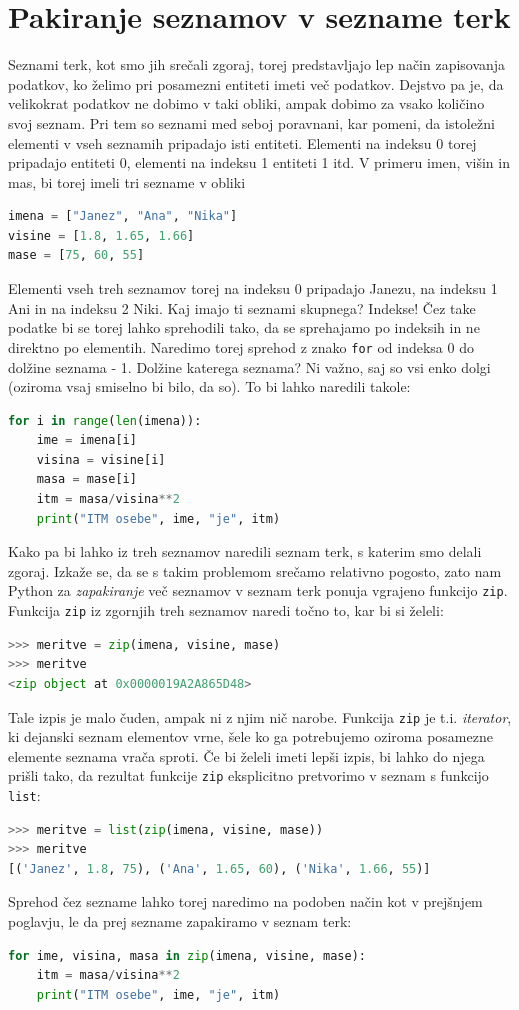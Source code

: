 \section{Pakiranje seznamov v sezname terk}
Seznami terk, kot smo jih srečali zgoraj, torej predstavljajo lep način zapisovanja podatkov, ko želimo pri posamezni entiteti imeti več podatkov. Dejstvo pa je, da velikokrat podatkov ne dobimo v taki obliki, ampak dobimo za vsako količino svoj seznam. Pri tem so seznami med seboj poravnani, kar pomeni, da istoležni elementi v vseh seznamih pripadajo isti entiteti. Elementi na indeksu 0 torej pripadajo entiteti 0, elementi na indeksu 1 entiteti 1 itd. V primeru imen, višin in mas, bi torej imeli tri sezname v obliki 
\begin{lstlisting}[language=Python, showstringspaces=false]
imena = ["Janez", "Ana", "Nika"]
visine = [1.8, 1.65, 1.66]
mase = [75, 60, 55]
\end{lstlisting}
Elementi vseh treh seznamov torej na indeksu 0 pripadajo Janezu, na indeksu 1 Ani in na indeksu 2 Niki. Kaj imajo ti seznami skupnega? Indekse! Čez take podatke bi se torej lahko sprehodili tako, da se sprehajamo po indeksih in ne direktno po elementih. Naredimo torej sprehod z znako \texttt{for} od indeksa 0 do dolžine seznama - 1. Dolžine katerega seznama? Ni važno, saj so vsi enko dolgi (oziroma vsaj smiselno bi bilo, da so). To bi lahko naredili takole:  
\begin{lstlisting}[language=Python, showstringspaces=false]
for i in range(len(imena)):
    ime = imena[i]
    visina = visine[i]
    masa = mase[i]
    itm = masa/visina**2
    print("ITM osebe", ime, "je", itm)
\end{lstlisting}
Kako pa bi lahko iz treh seznamov naredili seznam terk, s katerim smo delali zgoraj. Izkaže se, da se s takim problemom srečamo relativno pogosto, zato nam Python za \emph{zapakiranje} več seznamov v seznam terk ponuja vgrajeno funkcijo \texttt{zip}. Funkcija \texttt{zip} iz zgornjih treh seznamov naredi točno to, kar bi si želeli: 
\begin{lstlisting}[language=Python, showstringspaces=false]
>>> meritve = zip(imena, visine, mase)
>>> meritve
<zip object at 0x0000019A2A865D48>
\end{lstlisting}
Tale izpis je malo čuden, ampak ni z njim nič narobe. Funkcija \texttt{zip} je t.i. \emph{iterator}, ki dejanski seznam elementov vrne, šele ko ga potrebujemo oziroma posamezne elemente seznama vrača sproti. Če bi želeli imeti lepši izpis, bi lahko do njega prišli tako, da rezultat funkcije \texttt{zip} eksplicitno pretvorimo v seznam s funkcijo \texttt{list}:
\begin{lstlisting}[language=Python, showstringspaces=false]
>>> meritve = list(zip(imena, visine, mase))
>>> meritve
[('Janez', 1.8, 75), ('Ana', 1.65, 60), ('Nika', 1.66, 55)]
\end{lstlisting}
Sprehod čez sezname lahko torej naredimo na podoben način kot v prejšnjem poglavju, le da prej sezname zapakiramo v seznam terk:
\begin{lstlisting}[language=Python, showstringspaces=false]
for ime, visina, masa in zip(imena, visine, mase):
    itm = masa/visina**2
    print("ITM osebe", ime, "je", itm)
\end{lstlisting}


